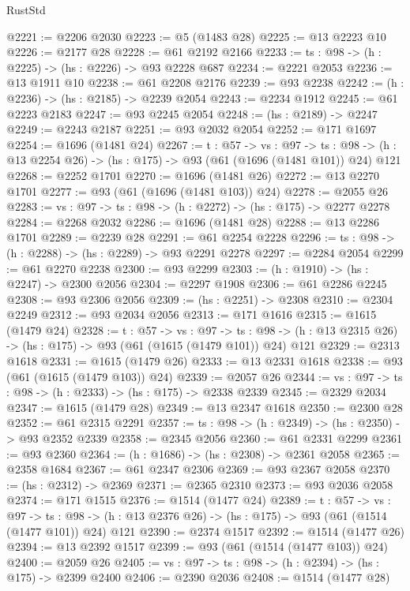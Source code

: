 \begin{lexlean}{RustStd}
\begin{coremodule}
@2221 := @2206 @2030
@2223 := @5 (@1483 @28)
@2225 := @13 @2223 @10
@2226 := @2177 @28
@2228 := @61 @2192 @2166
@2233 := {ts : @98} -> (h : @2225) -> (hs : @2226) -> @93 @2228 @687
@2234 := @2221 @2053
@2236 := @13 @1911 @10
@2238 := @61 @2208 @2176
@2239 := @93 @2238
@2242 := (h : @2236) -> (hs : @2185) -> @2239 @2054
@2243 := @2234 @1912
@2245 := @61 @2223 @2183
@2247 := @93 @2245 @2054
@2248 := (hs : @2189) -> @2247
@2249 := @2243 @2187
@2251 := @93 @2032 @2054
@2252 := @171 @1697
@2254 := @1696 (@1481 @24)
@2267 := {t : @57} ->
  {vs : @97} ->
  {ts : @98} -> (h : @13 @2254 @26) -> (hs : @175) -> @93 (@61 (@1696 (@1481 @101)) @24) @121
@2268 := @2252 @1701
@2270 := @1696 (@1481 @26)
@2272 := @13 @2270 @1701
@2277 := @93 (@61 (@1696 (@1481 @103)) @24)
@2278 := @2055 @26
@2283 := {vs : @97} -> {ts : @98} -> (h : @2272) -> (hs : @175) -> @2277 @2278
@2284 := @2268 @2032
@2286 := @1696 (@1481 @28)
@2288 := @13 @2286 @1701
@2289 := @2239 @28
@2291 := @61 @2254 @2228
@2296 := {ts : @98} -> (h : @2288) -> (hs : @2289) -> @93 @2291 @2278
@2297 := @2284 @2054
@2299 := @61 @2270 @2238
@2300 := @93 @2299
@2303 := (h : @1910) -> (hs : @2247) -> @2300 @2056
@2304 := @2297 @1908
@2306 := @61 @2286 @2245
@2308 := @93 @2306 @2056
@2309 := (hs : @2251) -> @2308
@2310 := @2304 @2249
@2312 := @93 @2034 @2056
@2313 := @171 @1616
@2315 := @1615 (@1479 @24)
@2328 := {t : @57} ->
  {vs : @97} ->
  {ts : @98} -> (h : @13 @2315 @26) -> (hs : @175) -> @93 (@61 (@1615 (@1479 @101)) @24) @121
@2329 := @2313 @1618
@2331 := @1615 (@1479 @26)
@2333 := @13 @2331 @1618
@2338 := @93 (@61 (@1615 (@1479 @103)) @24)
@2339 := @2057 @26
@2344 := {vs : @97} -> {ts : @98} -> (h : @2333) -> (hs : @175) -> @2338 @2339
@2345 := @2329 @2034
@2347 := @1615 (@1479 @28)
@2349 := @13 @2347 @1618
@2350 := @2300 @28
@2352 := @61 @2315 @2291
@2357 := {ts : @98} -> (h : @2349) -> (hs : @2350) -> @93 @2352 @2339
@2358 := @2345 @2056
@2360 := @61 @2331 @2299
@2361 := @93 @2360
@2364 := (h : @1686) -> (hs : @2308) -> @2361 @2058
@2365 := @2358 @1684
@2367 := @61 @2347 @2306
@2369 := @93 @2367 @2058
@2370 := (hs : @2312) -> @2369
@2371 := @2365 @2310
@2373 := @93 @2036 @2058
@2374 := @171 @1515
@2376 := @1514 (@1477 @24)
@2389 := {t : @57} ->
  {vs : @97} ->
  {ts : @98} -> (h : @13 @2376 @26) -> (hs : @175) -> @93 (@61 (@1514 (@1477 @101)) @24) @121
@2390 := @2374 @1517
@2392 := @1514 (@1477 @26)
@2394 := @13 @2392 @1517
@2399 := @93 (@61 (@1514 (@1477 @103)) @24)
@2400 := @2059 @26
@2405 := {vs : @97} -> {ts : @98} -> (h : @2394) -> (hs : @175) -> @2399 @2400
@2406 := @2390 @2036
@2408 := @1514 (@1477 @28)

\end{coremodule}
\end{lexlean}
